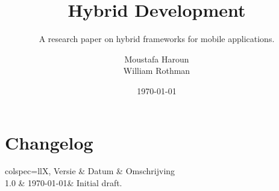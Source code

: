 \documentclass[fleqn,12pt]{article}
\title{Hybrid Development}
\subtitle{A research paper on hybrid frameworks for mobile applications.}
\author{Moustafa Haroun\\William Rothman} %
\date{\today}
\begin{document}
\maketitle

\newpage
\section{Changelog}\label{sec:changelog}

\begin{htable}[
		caption = {Changelog},
		label = {tab:changelog},
	]{
		colspec={llX},
	}
	Versie & Datum & Omschrijving \\
	1.0 & \today & Initial draft. \\
\end{htable}

\newpage
\tableofcontents

\newpage


\newpage


\newpage


\newpage
\printbibliography
\end{document}
